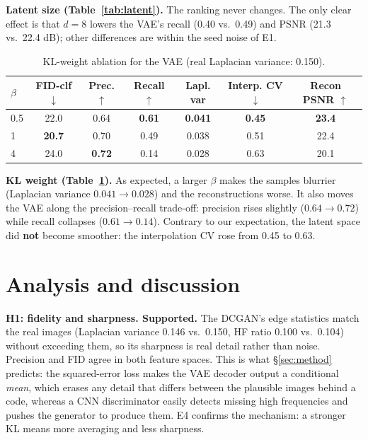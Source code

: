 \documentclass[11pt,letterpaper]{article}
\begin{document}
\textbf{Latent size (Table~\ref{tab:latent}).} The
ranking never changes. The only clear effect is that \(d=8\) lowers the
VAE's recall (0.40 vs.~0.49) and PSNR (21.3 vs.~22.4 dB); other
differences are within the seed noise of E1.

\begin{table}[!htbp]
\centering
\small
\begin{tabular}{@{}lcccccc@{}}
\toprule
\(\beta\) & FID-clf \(\downarrow\) & Prec. \(\uparrow\) & Recall \(\uparrow\) & Lapl. var & Interp. CV \(\downarrow\) & Recon PSNR \(\uparrow\) \\
\midrule
0.5 & 22.0 & 0.64 & \textbf{0.61} & \textbf{0.041} & \textbf{0.45} & \textbf{23.4} \\
1 & \textbf{20.7} & 0.70 & 0.49 & 0.038 & 0.51 & 22.4 \\
4 & 24.0 & \textbf{0.72} & 0.14 & 0.028 & 0.63 & 20.1 \\
\bottomrule
\end{tabular}
\caption{KL-weight ablation for the VAE (real Laplacian variance: 0.150).}
\label{tab:beta}
\end{table}


\textbf{KL weight (Table~\ref{tab:beta}).} As expected,
a larger \(\beta\) makes the samples blurrier (Laplacian variance
\(0.041 \to 0.028\)) and the reconstructions worse. It also moves the
VAE along the precision--recall trade-off: precision rises slightly
(\(0.64 \to 0.72\)) while recall collapses (\(0.61 \to 0.14\)). Contrary
to our expectation, the latent space did \textbf{not} become smoother:
the interpolation CV rose from 0.45 to 0.63.

\section{Analysis and discussion}\label{sec:discussion}

\textbf{H1: fidelity and sharpness. Supported.} The DCGAN's edge
statistics match the real images (Laplacian variance 0.146 vs.~0.150, HF
ratio 0.100 vs.~0.104) without exceeding them, so its sharpness is real
detail rather than noise. Precision and FID agree in both feature
spaces. This is what \S\ref{sec:method} predicts: the squared-error loss
makes the VAE decoder output a conditional \emph{mean}, which erases any
detail that differs between the plausible images behind a code, whereas
a CNN discriminator easily detects missing high frequencies and pushes
the generator to produce them. E4 confirms the mechanism: a stronger KL
means more averaging and less sharpness.
\end{document}

